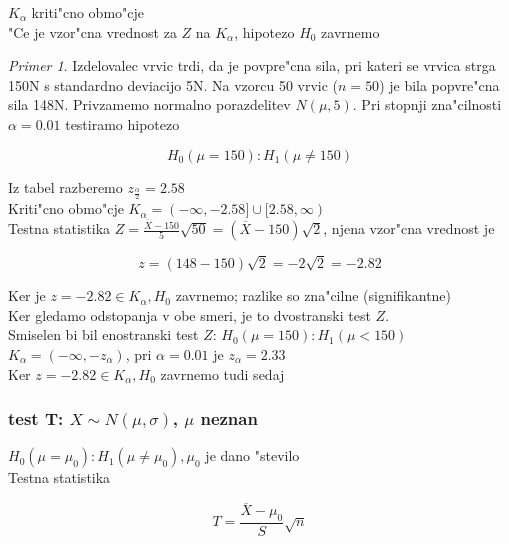 \documentclass[a4paper,12pt]{article}
\theoremstyle{definition}
\theoremstyle{remark}
\newtheorem*{ex}{Primer}
\begin{document}
$K_{\alpha}$ kriti"cno obmo"cje \\
"Ce je vzor"cna vrednost za $Z$ na $K_{\alpha}$, hipotezo $H_0$ zavrnemo

\begin{ex}
    Izdelovalec vrvic trdi, da je povpre"cna sila, pri kateri se vrvica strga 150N s standardno deviacijo
    5N. Na vzorcu 50 vrvic ($n=50$) je bila popvre"cna sila 148N. Privzamemo normalno porazdelitev $N(\mu,5)$.
    Pri stopnji zna"cilnosti $\alpha = 0.01$ testiramo hipotezo

    \begin{equation*}
        H_0(\mu = 150) : H_1(\mu \neq 150)
    \end{equation*}

    Iz tabel razberemo $z_{\frac{\alpha}{2}} = 2.58$ \\
    Kriti"cno obmo"cje $K_{\alpha} = (-\infty, -2.58] \cup [2.58, \infty)$ \\
    Testna statistika $Z = \frac{\overline{X}-150}{5} \sqrt{50} = (\overline{X}-150) \sqrt{2}$, njena vzor"cna
    vrednost je

    \begin{equation*}
        z = (148 - 150) \sqrt{2} = -2 \sqrt{2} = -2.82
    \end{equation*}

    Ker je $z = -2.82 \in K_{\alpha}, H_0$ zavrnemo; razlike so zna"cilne (signifikantne) \\
    Ker gledamo odstopanja v obe smeri, je to dvostranski test $Z$. \\
    Smiselen bi bil enostranski test $Z$: $H_0(\mu = 150) : H_1(\mu < 150)$ \\
    $K_{\alpha} = (-\infty, -z_{\alpha})$, pri $\alpha = 0.01$ je $z_{\alpha} = 2.33$ \\
    Ker $z = -2.82 \in K_{\alpha}, H_0$ zavrnemo tudi sedaj
\end{ex}

\subsubsection{test T: $X \sim N(\mu, \sigma)$, $\mu$ neznan}

$H_0(\mu = \mu_0) : H_1(\mu \neq \mu_0), \mu_0$ je dano "stevilo \\
Testna statistika

\begin{equation*}
    T = \frac{\overline{X} - \mu_0}{S} \sqrt{n}
\end{equation*}
\end{document}
